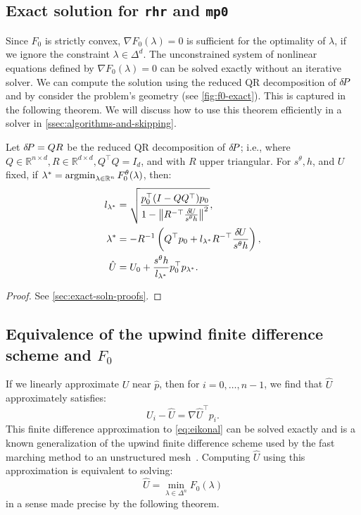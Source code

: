 \documentclass[sisc-eikonal.tex]{subfiles}
\begin{document}
\subsection{Exact solution for \texttt{rhr} and \texttt{mp0}}\label{ssec:exact-soln}

Since $F_0$ is strictly convex, $\nabla F_0(\lambda) = 0$ is
sufficient for the optimality of $\lambda$, if we ignore the
constraint $\lambda \in \Delta^d$. The unconstrained system of
nonlinear equations defined by $\nabla F_0(\lambda) = 0$ can be solved
exactly without an iterative solver. We can compute the solution using
the reduced QR decomposition of ${\delta \hspace{-0.14em} P}$ and by consider the problem's
geometry (see \cref{fig:f0-exact}). This is captured in the following
theorem. We will discuss how to use this theorem efficiently in a
solver in \cref{ssec:algorithms-and-skipping}.

\begin{theorem}\label{thm:f0-exact}
  Let ${\delta \hspace{-0.14em} P} = QR$ be the reduced QR decomposition of ${\delta \hspace{-0.14em} P}$; i.e.,
  where
  $Q \in \mathbb{R}^{n \times d}, R \in \mathbb{R}^{d \times d},
  Q^\top Q = I_d$, and with $R$ upper triangular. For $s^\theta, h$,
  and $U$ fixed, if
  $\lambda^* = \operatorname{argmin}_{\lambda \in \mathbb{R}^n}
  F_0^\theta(\lambda)$, then:
  \begin{align}
    l_{\lambda^*} &= \sqrt{\frac{p_0^\top {(I - QQ^\top)} p_0}{1 - \norm{R^{-\top} \frac{\delU}{s^\theta h}}^2}},\label{eq:l-star-expression} \\
    \lambda^* &= -R^{-1} \parens{Q^\top p_0 + l_{\lambda^*} R^{-\top} \frac{\delU}{s^\theta h}},\label{eq:f0-exact-lambda} \\ 
    \hat{U} &= U_0 + \frac{s^\theta h}{l_{\lambda^*}} p_0^\top p_{\lambda^*}.\label{eq:f0-exact}
  \end{align}
\end{theorem}

\begin{proof}
  See \cref{sec:exact-soln-proofs}.
\end{proof}

\subsection{Equivalence of the upwind finite difference scheme and
  $F_0$}\label{ssec:equivalence}

If we linearly approximate $U$ near $\hat{p}$, then for
$i = 0, \hdots, n - 1$, we find that $\hat{U}$ approximately
satisfies:
\begin{equation}
  \label{eq:finite-differences}
  U_i - \hat{U} = \nabla \hat{U}^\top p_i.
\end{equation}
This finite difference approximation to \cref{eq:eikonal} can be
solved exactly and is a known generalization of the upwind finite
difference scheme used by the fast marching method to an unstructured
mesh~\cite{kimmel1998computing,sethian2000fast}. Computing $\hat{U}$
using this approximation is equivalent to solving:
\begin{equation}
  \hat{U} = \min_{\lambda \in \Delta^n} F_0(\lambda)
\end{equation}
in a sense made precise by the following theorem.
\end{document}
